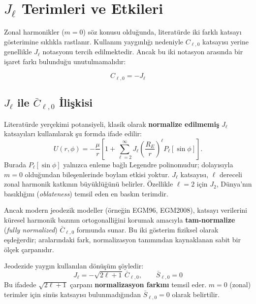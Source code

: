 \newpage
\section{\texorpdfstring{$J_\ell$}{J\_l} Terimleri ve Etkileri}

Zonal harmonikler ($m=0$) söz konusu olduğunda, literatürde iki farklı katsayı gösterimine sıklıkla rastlanır. Kullanım yaygınlığı nedeniyle $C_{\ell,0}$ katsayısı yerine genellikle $J_{\ell}$ notasyonu tercih edilmektedir. Ancak bu iki notasyon arasında bir işaret farkı bulunduğu unutulmamalıdır:

\begin{equation}
    C_{\ell,0} = - J_{\ell}
    \label{eq:C_J_relation}
\end{equation}

\subsection{\texorpdfstring{$J_\ell$ ile $\bar C_{\ell,0}$ İlişkisi}{J\_l ile C\_bar\_\{l,0\} İlişkisi}}
\label{subsec:Jn_relation}

Literatürde yerçekimi potansiyeli, klasik olarak \textbf{normalize edilmemiş} $J_{\ell}$ katsayıları kullanılarak şu formda ifade edilir:
\begin{equation}
U(r,\phi)
=
-\frac{\mu}{r}
\left[
1
+
\sum_{\ell=2}^{\infty}
J_\ell
\left(\frac{R_E}{r}\right)^\ell
P_\ell[\sin\phi]
\right].
\label{eq:zonal_potential}
\end{equation}
Burada $P_\ell[\sin\phi]$ yalnızca enleme bağlı Legendre polinomudur; dolayısıyla $m = 0$ olduğundan bileşenlerinde boylam etkisi yoktur. $J_\ell$ katsayısı, $\ell$ dereceli zonal harmonik katkının büyüklüğünü belirler. Özellikle $\ell=2$ için $J_2$, Dünya’nın basıklığını (\emph{oblateness}) temsil eden en baskın terimdir.

Ancak modern jeodezik modeller (örneğin EGM96, EGM2008), katsayı verilerini küresel harmonik bazının ortogonalliğini korumak amacıyla \textbf{tam-normalize} (\emph{fully normalized}) $\bar C_{\ell,0}$ formunda sunar. Bu iki gösterim fiziksel olarak eşdeğerdir; aralarındaki fark, normalizasyon tanımından kaynaklanan sabit bir ölçek çarpanıdır.

Jeodezide yaygın kullanılan dönüşüm şöyledir:
\begin{equation}
J_\ell = -\sqrt{2\ell+1}\,\bar C_{\ell,0},
\qquad \bar S_{\ell,0}=0
\label{eq:Jn_Cn0_relation}
\end{equation}
Bu ifadede $\sqrt{2\ell+1}$ çarpanı \textbf{normalizasyon farkını} temsil eder. $m=0$ (zonal) terimler için sinüs katsayısı bulunmadığından $\bar S_{\ell,0}=0$ olarak belirtilir.

